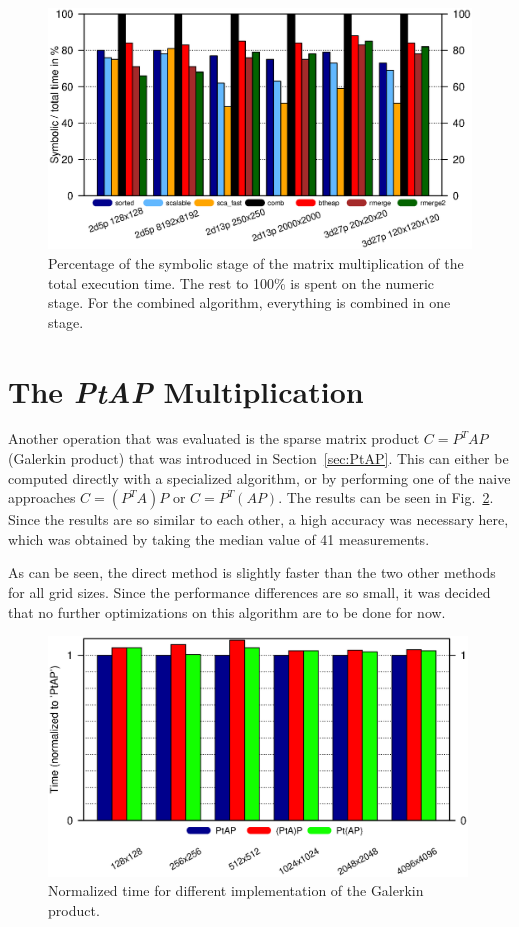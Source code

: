 \begin{figure}[tbp]
	\centering
	\includegraphics[width=1.05\textwidth, trim={0 2.cm 0 6cm},clip]{seq_symnum}
	\caption{Percentage of the symbolic stage of the matrix multiplication of the total execution time. The rest to 100\% is spent on the numeric stage. For the combined algorithm, everything is combined in one stage.} 
	\label{fig:seqsymnum}
\end{figure}


\section{The \textit{PtAP} Multiplication}
Another operation that was evaluated is the sparse matrix product $C = P^T A P$ (Galerkin product) that was introduced in Section~\ref{sec:PtAP}. This can either be computed directly with a specialized algorithm, or by performing one of the naive approaches $C = (P^T A) P$ or $C = P^T (A P)$. The results can be seen in Fig.~\ref{fig:ex2_ptap}. Since the results are so similar to each other, a high accuracy was necessary here, which was obtained by taking the median value of 41 measurements.

As can be seen, the direct method is slightly faster than the two other methods for all grid sizes. 	Since the performance differences are so small, it was decided that no further optimizations on this algorithm are to be done for now.

\begin{figure}[tbp]
	\centering
	\includegraphics[width=0.99\textwidth,  trim={0 2.cm 0 6cm},clip]{ex2_PtAP}
	\caption{Normalized time for different implementation of the Galerkin product.} 
	\label{fig:ex2_ptap}
\end{figure}

